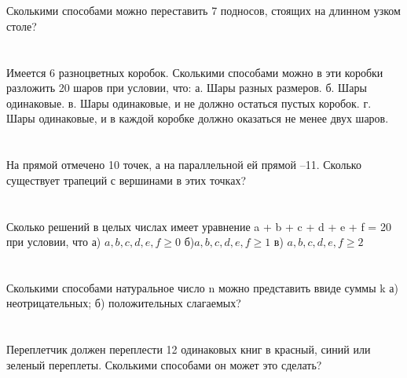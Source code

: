 \documentclass{article}%
\begin{document}
%
\section{}%
\label{sec:}%
Сколькими способами можно переставить 7 подносов, стоящих на длинном узком столе?%
%
\iffalse%
Автор: Ираклий Гагуа%
Дата: 07{-}01{-}2011%
Название: None%
Подсказка: \textbackslash{}\textbackslash{}%
nan%
\fi

%
\section{}%
\label{sec:}%
Имеется 6 разноцветных коробок. Сколькими способами можно в эти коробки
разложить 20 шаров при условии, что:
а. Шары разных размеров.
б. Шары одинаковые.
в. Шары одинаковые, и не должно остаться пустых коробок.
г. Шары одинаковые, и в каждой коробке должно оказаться не менее двух шаров.%
%
\iffalse%
Автор: Дмитрий Трущин%
Дата: 01{-}10{-}2013%
Название: None%
Подсказка: \textbackslash{}\textbackslash{}%
nan%
\fi

%
\section{}%
\label{sec:}%
На прямой отмечено 10 точек, а на параллельной ей прямой –11. Сколько
существует трапеций с вершинами в этих точках?%
%
\iffalse%
Автор: 25 школа%
Дата: 01{-}07{-}2017%
Название: None%
Подсказка: \textbackslash{}\textbackslash{}%
nan%
\fi

%
\section{}%
\label{sec:}%
Сколько решений в целых числах имеет уравнение a + b + c + d + e + f = 20 при
условии, что
а) $a, b, c, d, e, f \geq 0$ б)$a, b, c, d, e, f \geq 1$ в) $a, b, c, d, e, f \geq 2$%
%
\iffalse%
Автор: Дмитрий Трущин%
Дата: 01{-}10{-}2013%
Название: None%
Подсказка: \textbackslash{}\textbackslash{}%
nan%
\fi

%
\section{}%
\label{sec:}%
Сколькими способами натуральное число n можно представить ввиде суммы k
а) неотрицательных; б) положительных слагаемых?%
%
\iffalse%
Автор: Дмитрий Трущин%
Дата: 01{-}10{-}2013%
Название: None%
Подсказка: \textbackslash{}\textbackslash{}%
nan%
\fi

%
\section{}%
\label{sec:}%
Переплетчик должен переплести 12 одинаковых книг в красный, синий или
зеленый переплеты. Сколькими способами он может это сделать?%
%
\iffalse%
Автор: Дмитрий Трущин%
Дата: 01{-}10{-}2013%
Название: None%
Подсказка: \textbackslash{}\textbackslash{}%
nan%
\fi
\end{document}
